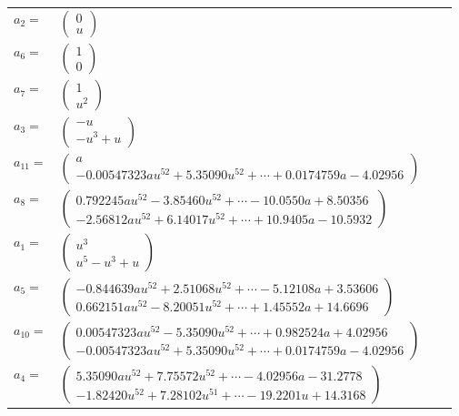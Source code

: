 \documentclass[1p]{elsarticle_modified}
\theoremstyle{definition}
\begin{document}
\begin{tabular}{m{7pt} m{180pt} m{7pt} m{180pt} }
\flushright $a_{2}=$&$\begin{pmatrix}0\\u\end{pmatrix}$ \\
\flushright $a_{6}=$&$\begin{pmatrix}1\\0\end{pmatrix}$ \\
\flushright $a_{7}=$&$\begin{pmatrix}1\\u^2\end{pmatrix}$ \\
\flushright $a_{3}=$&$\begin{pmatrix}- u\\- u^3+u\end{pmatrix}$ \\
\flushright $a_{11}=$&$\begin{pmatrix}a\\-0.00547323 a u^{52}+5.35090 u^{52}+\cdots+0.0174759 a-4.02956\end{pmatrix}$ \\
\flushright $a_{8}=$&$\begin{pmatrix}0.792245 a u^{52}-3.85460 u^{52}+\cdots-10.0550 a+8.50356\\-2.56812 a u^{52}+6.14017 u^{52}+\cdots+10.9405 a-10.5932\end{pmatrix}$ \\
\flushright $a_{1}=$&$\begin{pmatrix}u^3\\u^5- u^3+u\end{pmatrix}$ \\
\flushright $a_{5}=$&$\begin{pmatrix}-0.844639 a u^{52}+2.51068 u^{52}+\cdots-5.12108 a+3.53606\\0.662151 a u^{52}-8.20051 u^{52}+\cdots+1.45552 a+14.6696\end{pmatrix}$ \\
\flushright $a_{10}=$&$\begin{pmatrix}0.00547323 a u^{52}-5.35090 u^{52}+\cdots+0.982524 a+4.02956\\-0.00547323 a u^{52}+5.35090 u^{52}+\cdots+0.0174759 a-4.02956\end{pmatrix}$ \\
\flushright $a_{4}=$&$\begin{pmatrix}5.35090 a u^{52}+7.75572 u^{52}+\cdots-4.02956 a-31.2778\\-1.82420 u^{52}+7.28102 u^{51}+\cdots-19.2201 u+14.3168\end{pmatrix}$ \\

\end{tabular}
\end{document}
